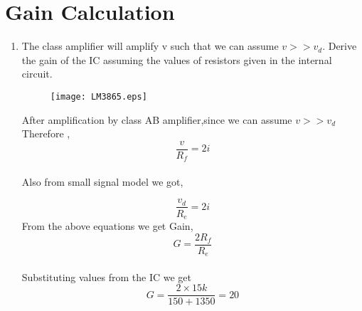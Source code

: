 \documentclass[journal,12pt,twocolumn]{IEEEtran}
\renewcommand\thesection{\arabic{section}}
\begin{document}
\section{Gain Calculation}
\begin{enumerate}[label=\thesection.\arabic*,ref=\thesection.\theenumi]
\item The class amplifier will amplify v such that we can assume $v>>v_{d}$. Derive the gain of the IC assuming the values of resistors given in the internal circuit.\\
\solution
\begin{figure}[!ht]
  \centering
 
    \texttt{[image: LM3865.eps]}

\caption{}
\label{fig:6}
\end{figure}

After amplification by class AB amplifier,since we can assume $v>>v_{d}$ \\
Therefore , $$\frac{v}{R_{f}}=2i$$ \\
Also from small signal model we got,

   $$ \frac{v_{d}}{R_{e}}=2i
$$
From the above equations we get Gain, $$G=\frac{2 R_{f}}{R_{e}}$$\\
Substituting values from the IC we get $$G=\frac{2 \times 15k}{150+1350} =20$$    

\end{enumerate}
\end{document}
